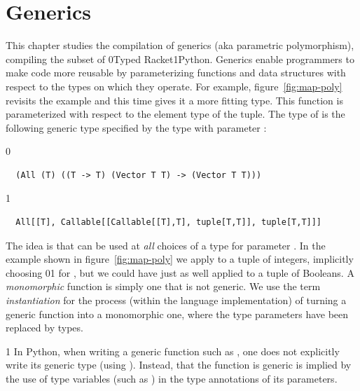 \documentclass[7x10]{TimesAPriori_MIT}%
\def\racketEd{0}
\def\pythonEd{1}
\providecommand{\BookEdition}{1}
\let\edition\BookEdition
\newcommand{\racket}[1]{{\if\edition\racketEd{#1}\fi}}
\newcommand{\pythonColor}[0]{}
\newcommand{\python}[1]{{\if\edition\pythonEd\pythonColor #1\fi}}
\numberwithin{theorem}{chapter}
\numberwithin{definition}{chapter}
\numberwithin{equation}{chapter}
\begin{document}

\chapter{Generics}
\label{ch:Lpoly}
\setcounter{footnote}{0}

This chapter studies the compilation of
generics (aka parametric
polymorphism), compiling the
\LangPoly{} subset of \racket{Typed Racket}\python{Python}.  Generics
enable programmers to make code more reusable by parameterizing
functions and data structures with respect to the types on which they
operate. For example, figure~\ref{fig:map-poly} revisits the
 example and this time gives it a more fitting type.  This
 function is parameterized with respect to the element type
of the tuple. The type of  is the following generic type
specified by the  type with parameter :
{\if\edition\racketEd
\begin{lstlisting}
  (All (T) ((T -> T) (Vector T T) -> (Vector T T)))
\end{lstlisting}
\fi}
{\if\edition\pythonEd\pythonColor
\begin{lstlisting}
  All[[T], Callable[[Callable[[T],T], tuple[T,T]], tuple[T,T]]]
\end{lstlisting}
\fi}
%
The idea is that  can be used at \emph{all} choices of a
type for parameter . In the example shown in
figure~\ref{fig:map-poly} we apply  to a tuple of integers,
implicitly choosing \racket{}\python{} for
, but we could have just as well applied  to a tuple
of Booleans.
%
A \emph{monomorphic} function is simply one that is not generic.
%
We use the term \emph{instantiation} for the process (within the
language implementation) of turning a generic function into a
monomorphic one, where the type parameters have been replaced by
types.

{\if\edition\pythonEd\pythonColor
%
In Python, when writing a generic function such as , one
does not explicitly write its generic type (using ).
Instead, that the function is generic is implied by the use of type
variables (such as ) in the type annotations of its
parameters.
%
\fi}
\end{document}
